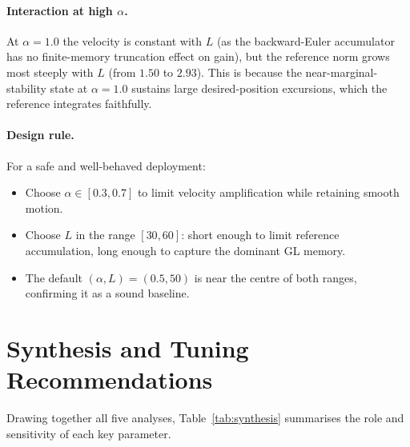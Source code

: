 \documentclass[11pt,a4paper]{article}
\theoremstyle{definition}
\begin{document}
\paragraph{Interaction at high $\alpha$.}
At $\alpha = 1.0$ the velocity is constant with $L$ (as the backward-Euler
accumulator has no finite-memory truncation effect on gain), but the reference
norm grows most steeply with $L$ (from $1.50$ to $2.93$).  This is because
the near-marginal-stability state at $\alpha = 1.0$ sustains large
desired-position excursions, which the reference integrates faithfully.

\paragraph{Design rule.}
For a safe and well-behaved deployment:
\begin{itemize}[noitemsep]
  \item Choose $\alpha \in [0.3, 0.7]$ to limit velocity amplification while
        retaining smooth motion.
  \item Choose $L$ in the range $[30, 60]$: short enough to limit reference
        accumulation, long enough to capture the dominant GL memory.
  \item The default $(\alpha, L) = (0.5, 50)$ is near the centre of both ranges,
        confirming it as a sound baseline.
\end{itemize}

\section{Synthesis and Tuning Recommendations}
\label{sec:synthesis}

Drawing together all five analyses, Table~\ref{tab:synthesis} summarises the
role and sensitivity of each key parameter.
\end{document}
